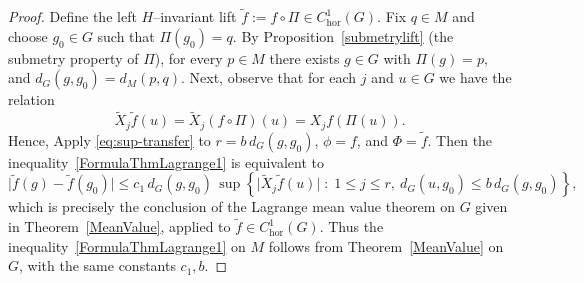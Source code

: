 \documentclass[12pt]{amsart}
\begin{document}
\begin{proof}
Define the left $H$--invariant lift
\(
\tilde f := f\circ \Pi \in C^1_{\mathrm{hor}}(G).
\)
Fix $q\in M$ and choose $g_0\in G$ such that $\Pi(g_0)=q$.
By Proposition~\ref{submetrylift} (the submetry property of $\Pi$), for every $p\in M$ there exists
$g\in G$ with
\(
\Pi(g)=p,
\) and \(
d_G(g,g_0) = d_M(p,q).
\)
Next, observe that for each $j$ and $u\in G$ we have the relation
\[
\tilde X_j \tilde f(u)
= \tilde X_j(f\circ \Pi)(u)
= X_j f(\Pi(u)).
\]
Hence, Apply \eqref{eq:sup-transfer}
to $r=b\, d_G(g,g_0)$, $\phi=f$, and $\Phi=\tilde f$. Then
the inequality~\eqref{FormulaThmLagrange1} is equivalent to
\[
\big|\tilde f(g)-\tilde f(g_0)\big|
\leq
c_1\, d_G(g,g_0)\,
\sup\left\{\big| \tilde X_j \tilde f(u)\big| \;:\; 1\leq j\leq r,\ d_G(u,g_0)\leq b\, d_G(g,g_0)\right\},
\]
which is precisely the conclusion of the Lagrange mean value theorem on $G$ given in Theorem~\ref{MeanValue},
applied to $\tilde f\in C^1_{\mathrm{hor}}(G)$.
Thus the inequality~\eqref{FormulaThmLagrange1} on $M$ follows from Theorem~\ref{MeanValue} on $G$,
with the same constants $c_1,b$.
\end{proof}
\end{document}
